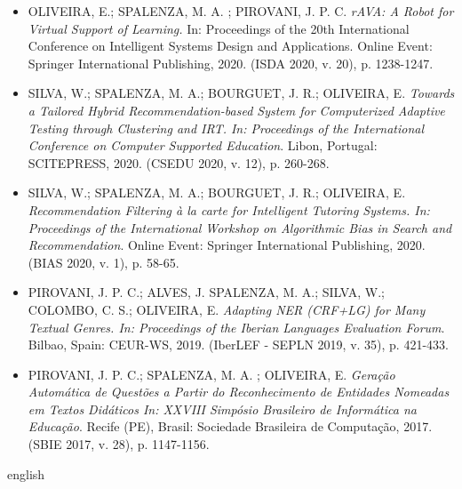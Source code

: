 \documentclass[
	12pt,				%
	openright,			%
	twoside,			%
	a4paper,			%
	english,			%
	french,				%
	spanish,			%
	brazil				%
	]{abntex2}
\begin{document}
\begin{itemize}[label={}]
\scriptsize
\item OLIVEIRA, E.; SPALENZA, M. A. ; PIROVANI, J. P. C. \textit{rAVA: A Robot for Virtual Support of Learning.} In: Proceedings of the 20th International Conference on Intelligent Systems Design and Applications. Online Event: Springer International Publishing, 2020. (ISDA 2020, v. 20), p. 1238-1247.

\item SILVA, W.; SPALENZA, M. A.; BOURGUET, J. R.; OLIVEIRA, E. \textit{Towards a Tailored Hybrid Recommendation-based System for Computerized Adaptive Testing through Clustering and IRT. In: Proceedings of the International Conference on Computer Supported Education}. Libon, Portugal: SCITEPRESS, 2020. (CSEDU 2020, v. 12), p. 260-268.

\item SILVA, W.; SPALENZA, M. A.; BOURGUET, J. R.; OLIVEIRA, E. \textit{Recommendation Filtering {\`a} la carte for Intelligent Tutoring Systems. In: Proceedings of the International Workshop on Algorithmic Bias in Search and Recommendation}. Online Event:  Springer International Publishing, 2020. (BIAS 2020, v. 1), p. 58-65.

\item PIROVANI, J. P. C.; ALVES, J. SPALENZA, M. A.; SILVA, W.; COLOMBO, C. S.; OLIVEIRA, E. \textit{Adapting NER (CRF+LG) for Many Textual Genres. In: Proceedings of the Iberian Languages Evaluation Forum}. Bilbao, Spain: CEUR-WS, 2019. (IberLEF - SEPLN 2019, v. 35), p. 421-433. 

\item PIROVANI, J. P. C.; SPALENZA, M. A. ; OLIVEIRA, E. \textit{Gera{\c c}{\~a}o Autom{\'a}tica de Quest{\~o}es a Partir do Reconhecimento de Entidades Nomeadas em Textos Did{\'a}ticos In: XXVIII Simp{\'o}sio Brasileiro de Inform{\'a}tica na Educa{\c c}{\~a}o}. Recife (PE), Brasil: Sociedade Brasileira de Computa{\c c}{\~a}o, 2017. (SBIE 2017, v. 28), p. 1147-1156.

\end{itemize}

\cleardoublepage

\setlength{\absparsep}{18pt}
\begin{resumo}

\end{resumo}


\begin{resumo}[Abstract]
\begin{otherlanguage*}{english}

\end{otherlanguage*}
\end{resumo}
\end{document}
